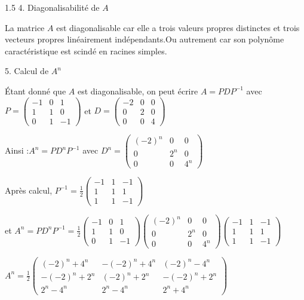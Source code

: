 \documentclass[12pt]{article}
\begin{document}
\begin{spacing}{1.5}
4. Diagonalisabilité de $A$

La matrice $A$ est diagonalisable car elle a trois valeurs propres distinctes et trois vecteurs propres linéairement indépendants.Ou autrement car son polynôme caractéristique est scindé en racines simples.

5. Calcul de $A^n$

Étant donné que $A$ est diagonalisable, on peut écrire $A=PDP^{-1}$ avec $P=\begin{pmatrix}
-1 & 0 & 1 \\ 
1 & 1 & 0 \\ 
0 & 1 & -1
\end{pmatrix}$ et $D=\begin{pmatrix}
-2 & 0 & 0 \\ 
0 & 2 & 0 \\ 
0 & 0 & 4
\end{pmatrix}$

Ainsi :$A^n=PD^nP^{-1}$  avec $D^n=\begin{pmatrix}
(-2)^n & 0 & 0 \\ 
0 & 2^n & 0 \\ 
0 & 0 & 4^n
\end{pmatrix}$

Après calcul, $P^{-1}=\frac{1}{2}\begin{pmatrix}
-1 & 1 & -1 \\ 
1 & 1 & 1 \\ 
1 & 1 & -1
\end{pmatrix}$

et $A^n=PD^nP^{-1}=\frac{1}{2}\begin{pmatrix}
-1 & 0 & 1 \\ 
1 & 1 & 0 \\ 
0 & 1 & -1
\end{pmatrix}\begin{pmatrix}
(-2)^n & 0 & 0 \\ 
0 & 2^n & 0 \\ 
0 & 0 & 4^n
\end{pmatrix}\begin{pmatrix}
-1 & 1 & -1 \\ 
1 & 1 & 1 \\ 
1 & 1 & -1
\end{pmatrix}$


$A^n=\frac{1}{2}\begin{pmatrix}
(-2)^n+4^n & -(-2)^n+4^n & (-2)^n-4^n \\ 
-(-2)^n+2^n & (-2)^n+2^n & -(-2)^n+2^n \\ 
2^n-4^n & 2^n-4^n & 2^n+4^n
\end{pmatrix}$


\end{spacing}
\end{document}
